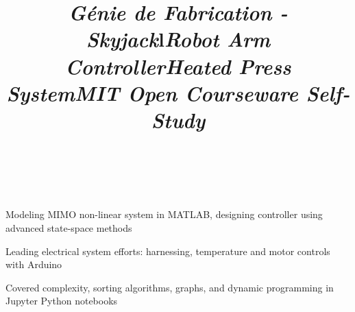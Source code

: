 \documentclass[mm]{res}
\begin{document}
\begin{resume}
\title{\textsl{G\'enie de Fabrication - Skyjack}}
\begin{position}
\end{position}


\toprule

\section{\headingprojects}
\begin{format}
\title{l}\\
\body\\
\end{format}


\title{\textsl{Robot Arm Controller}}
\begin{position}
\tb Modeling MIMO non-linear system in MATLAB, designing controller using advanced state-space methods
\end{position}

\title{\textsl{Heated Press System}}
\begin{position}
\tb Leading electrical system efforts: harnessing, temperature and motor controls with Arduino
\end{position}


\title{\textsl{MIT Open Courseware Self-Study}}
\begin{position}
\tb Covered complexity, sorting algorithms, graphs, and dynamic programming in Jupyter Python notebooks
\end{position}


\end{resume}
\end{document}
